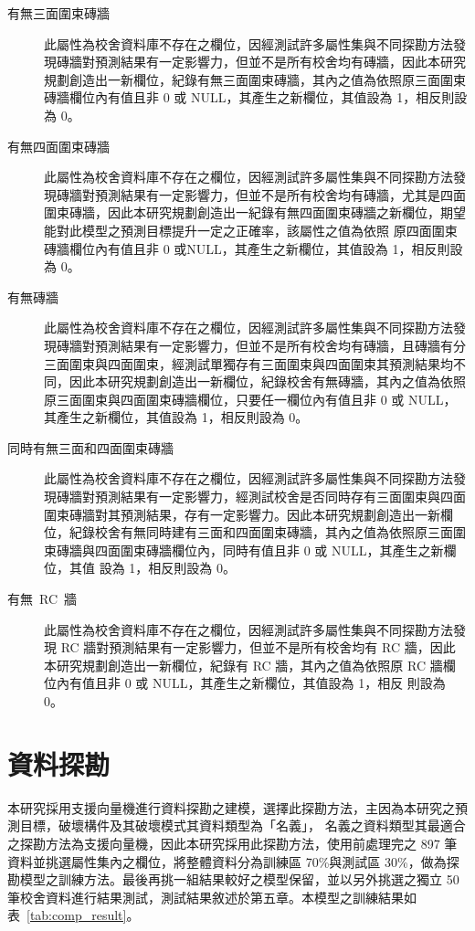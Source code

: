 \begin{description}
  \item[有無三面圍束磚牆]
  此屬性為校舍資料庫不存在之欄位，因經測試許多屬性集與不同探勘方法發現磚牆對預測結果有一定影響力，但並不是所有校舍均有磚牆，因此本研究規劃創造出一新欄位，紀錄有無三面圍束磚牆，其內之值為依照原三面圍束磚牆欄位內有值且非 0 或 NULL，其產生之新欄位，其值設為 1，相反則設為 0。
  \item[有無四面圍束磚牆]
  此屬性為校舍資料庫不存在之欄位，因經測試許多屬性集與不同探勘方法發現磚牆對預測結果有一定影響力，但並不是所有校舍均有磚牆，尤其是四面圍束磚牆，因此本研究規劃創造出一紀錄有無四面圍束磚牆之新欄位，期望能對此模型之預測目標提升一定之正確率，該屬性之值為依照 原四面圍束磚牆欄位內有值且非 0 或NULL，其產生之新欄位，其值設為 1，相反則設為 0。
  \item[有無磚牆]
  此屬性為校舍資料庫不存在之欄位，因經測試許多屬性集與不同探勘方法發現磚牆對預測結果有一定影響力，但並不是所有校舍均有磚牆，且磚牆有分三面圍束與四面圍束，經測試單獨存有三面圍束與四面圍束其預測結果均不同，因此本研究規劃創造出一新欄位，紀錄校舍有無磚牆，其內之值為依照原三面圍束與四面圍束磚牆欄位，只要任一欄位內有值且非 0 或 NULL，其產生之新欄位，其值設為 1，相反則設為 0。
  \item[同時有無三面和四面圍束磚牆]
  此屬性為校舍資料庫不存在之欄位，因經測試許多屬性集與不同探勘方法發現磚牆對預測結果有一定影響力，經測試校舍是否同時存有三面圍束與四面圍束磚牆對其預測結果，存有一定影響力。因此本研究規劃創造出一新欄位，紀錄校舍有無同時建有三面和四面圍束磚牆，其內之值為依照原三面圍束磚牆與四面圍束磚牆欄位內，同時有值且非 0 或 NULL，其產生之新欄位，其值 設為 1，相反則設為 0。
  \item[有無~RC~牆]
  此屬性為校舍資料庫不存在之欄位，因經測試許多屬性集與不同探勘方法發現 RC 牆對預測結果有一定影響力，但並不是所有校舍均有 RC 牆，因此本研究規劃創造出一新欄位，紀錄有 RC 牆，其內之值為依照原 RC 牆欄位內有值且非 0 或 NULL，其產生之新欄位，其值設為 1，相反 則設為 0。
\end{description}

\section{資料探勘}

本研究採用支援向量機進行資料探勘之建模，選擇此探勘方法，主因為本研究之預測目標，破壞構件及其破壞模式其資料類型為「名義」， 名義之資料類型其最適合之探勘方法為支援向量機，因此本研究採用此探勘方法，使用前處理完之 897 筆資料並挑選屬性集內之欄位，將整體資料分為訓練區 70\%與測試區 30\%，做為探勘模型之訓練方法。最後再挑一組結果較好之模型保留，並以另外挑選之獨立 50 筆校舍資料進行結果測試，測試結果敘述於第五章。本模型之訓練結果如表~\ref{tab:comp_result}。


